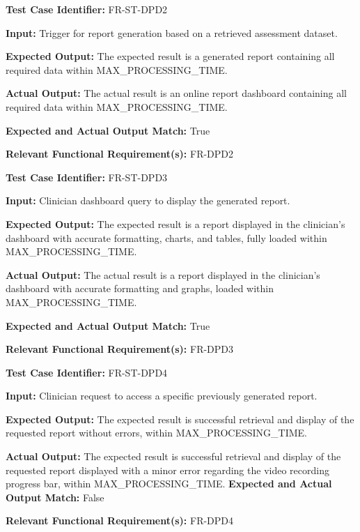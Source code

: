 \documentclass[12pt, titlepage]{article}
\begin{document}
\begin{mdframed}[linewidth=0.5mm] \par
  \textbf{Test Case Identifier:} FR-ST-DPD2 \par
  \textbf{Input:} Trigger for report generation based on a retrieved assessment dataset. \par
  \textbf{Expected Output:} The expected result is a generated report containing all required data within MAX\_PROCESSING\_TIME. \par
  \textbf{Actual Output:} The actual result is an online report dashboard containing all required data within MAX\_PROCESSING\_TIME.  \par
  \textbf{Expected and Actual Output Match:} True \par
  \textbf{Relevant Functional Requirement(s):} FR-DPD2
\end{mdframed}

\begin{mdframed}[linewidth=0.5mm] \par
  \textbf{Test Case Identifier:} FR-ST-DPD3 \par
  \textbf{Input:} Clinician dashboard query to display the generated report. \par
  \textbf{Expected Output:} The expected result is a report displayed in the clinician’s dashboard with accurate formatting, charts, and tables, fully loaded within MAX\_PROCESSING\_TIME. \par
  \textbf{Actual Output:} The actual result is a report displayed in the clinician’s dashboard with accurate formatting and graphs, loaded within \\MAX\_PROCESSING\_TIME. \par
  \textbf{Expected and Actual Output Match:} True \par
  \textbf{Relevant Functional Requirement(s):} FR-DPD3
\end{mdframed}

\begin{mdframed}[linewidth=0.5mm] \par
  \textbf{Test Case Identifier:} FR-ST-DPD4 \par
  \textbf{Input:} Clinician request to access a specific previously generated report. \par
  \textbf{Expected Output:} The expected result is successful retrieval and display of the requested report without errors, within MAX\_PROCESSING\_TIME. \par
  \textbf{Actual Output:} The expected result is successful retrieval and display of the requested report displayed with a minor error regarding the video recording progress bar, within MAX\_PROCESSING\_TIME.
  \textbf{Expected and Actual Output Match:} False \par
  \textbf{Relevant Functional Requirement(s):} FR-DPD4
\end{mdframed}
\end{document}
